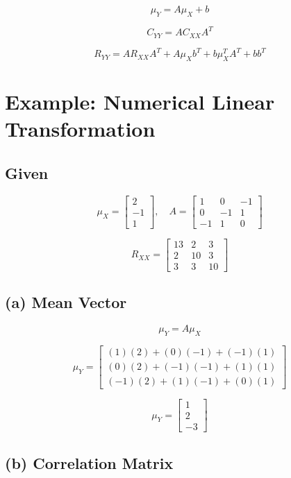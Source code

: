 \documentclass[12pt]{article}
\begin{document}
\[
\mu_Y = A\mu_X + b
\]

\[
C_{YY} = A C_{XX} A^T
\]

\[
R_{YY} = A R_{XX} A^T + A\mu_X b^T + b\mu_X^T A^T + bb^T
\]

\section{Example: Numerical Linear Transformation}

\subsection{Given}

\[
\mu_X =
\begin{bmatrix}
2 \\
-1 \\
1
\end{bmatrix}, \quad
A =
\begin{bmatrix}
1 & 0 & -1 \\
0 & -1 & 1 \\
-1 & 1 & 0
\end{bmatrix}
\]

\[
R_{XX} =
\begin{bmatrix}
13 & 2 & 3 \\
2 & 10 & 3 \\
3 & 3 & 10
\end{bmatrix}
\]

\subsection{(a) Mean Vector}

\[
\mu_Y = A\mu_X
\]

\[
\mu_Y =
\begin{bmatrix}
(1)(2) + (0)(-1) + (-1)(1) \\
(0)(2) + (-1)(-1) + (1)(1) \\
(-1)(2) + (1)(-1) + (0)(1)
\end{bmatrix}
\]

\[
\mu_Y =
\begin{bmatrix}
1 \\
2 \\
-3
\end{bmatrix}
\]

\subsection{(b) Correlation Matrix}
\end{document}
